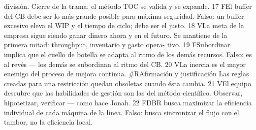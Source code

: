   división.
  Cierre de la trama: el método TOC se valida y se expande.
17   FEl buffer del CB debe ser lo más grande posible para máxima seguridad.
  Falso: un buffer excesivo eleva el WIP y el tiempo de ciclo; debe ser el
  justo.
18   VLa meta de la empresa sigue siendo ganar dinero ahora y en el futuro.
  Se mantiene de la primera mitad: throughput, inventario y gasto opera-
  tivo.
19   FSubordinar implica que el cuello de botella se adapta al ritmo de los
  demás recursos.
  Falso: es al revés — los demás se subordinan al ritmo del CB.
20   VLa inercia es el mayor enemigo del proceso de mejora continua.
#RAfirmación y justificación
  Las reglas creadas para una restricción quedan obsoletas cuando ésta
  cambia.
21   VEl equipo descubre que las habilidades de gestión son las del método
  científico.
  Observar, hipotetizar, verificar — como hace Jonah.
22   FDBR busca maximizar la eficiencia individual de cada máquina de la
  línea.
  Falso: busca sincronizar el flujo con el tambor, no la eficiencia local.
